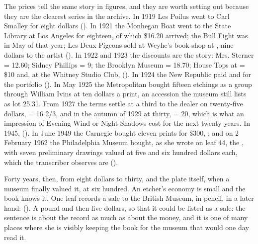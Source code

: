 The prices tell the same story in figures, and they are worth setting out because they are the clearest series in the archive. In 1919 Les Poilus went to Carl Smalley for eight dollars (). In 1921 the Monhegan Boat went to the State Library at Los Angeles for eighteen, of which \$16.20 arrived; the Bull Fight was  in May of that year; Les Deux Pigeons sold at Weyhe's book shop at , nine dollars to the artist (). In 1922 and 1923 the discounts are the story: Mrs. Sterner  = 12.60; Sidney Phillips  = 9; the Brooklyn Museum  = 18.70; House Tops at  = \$10 and, at the Whitney Studio Club,  (). In 1924 the New Republic paid  and  for the portfolio (). In May 1925 the Metropolitan bought fifteen etchings as a group through William Ivins at ten dollars a print, an accession the museum still lists as lot 25.31. From 1927 the terms settle at a third to the dealer on twenty-five dollars,  = 16 2/3, and in the autumn of 1929 at thirty,  = 20, which is what an impression of Evening Wind or Night Shadows cost for the next twenty years. In 1945,  (). In June 1949 the Carnegie bought eleven prints for \$300, ; and on 2 February 1962 the Philadelphia Museum bought, as she wrote on leaf 44, the , with seven preliminary drawings valued at five and six hundred dollars each, which the transcriber observes are  ().

Forty years, then, from eight dollars to thirty, and the plate itself, when a museum finally valued it, at six hundred. An etcher's economy is small and the book knows it. One leaf records a sale to the British Museum, in pencil, in a later hand:  (). A pound and then five dollars, so that it could be listed as a sale: the sentence is about the record as much as about the money, and it is one of many places where she is visibly keeping the book for the museum that would one day read it.

